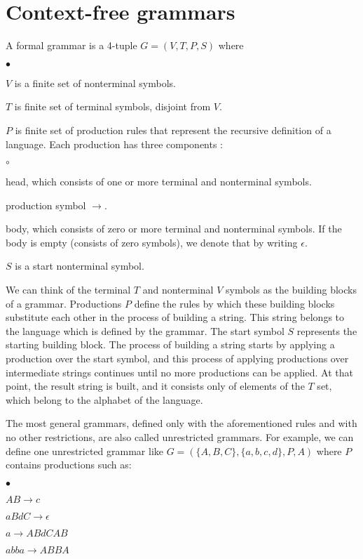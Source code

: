 \section{Context-free grammars}
A formal grammar is a 4-tuple $G = (V, T, P, S)$ \citep{sipser2013introduction} where
\begin{list}{$\bullet$}{}  	
	\item $V$ is a finite set of nonterminal symbols.
	\item $T$ is finite set of terminal symbols, disjoint from $V$.
	\item $P$ is finite set of production rules that represent the recursive definition of a language. Each production has three components \citep{hopcroft2007automatatheory}:
		\begin{list}{$\circ$}{}
			\item head, which consists of one or more terminal and nonterminal symbols.
			\item production symbol $\rightarrow$.
			\item body, which consists of zero or more terminal and nonterminal symbols. If the body is empty (consists of zero symbols), we denote that by writing $\epsilon$.
		\end{list}
	\item $S$ is a start nonterminal symbol.
\end{list}

We can think of the terminal $T$ and nonterminal $V$ symbols as the building blocks of a grammar. Productions $P$ define the rules by which these building blocks substitute each other in the process of building a string. This string belongs to the language which is defined by the grammar. The start symbol $S$ represents the starting building block. The process of building a string starts by applying a production over the start symbol, and this process of applying productions over intermediate strings continues until no more productions can be applied. At that point, the result string is built, and it consists only of elements of the $T$ set, which belong to the alphabet of the language.

The most general grammars, defined only with the aforementioned rules and with no other restrictions, are also called unrestricted grammars. For example, we can define one unrestricted grammar like $G = (\{A, B, C\}, \{a, b, c, d\}, P, A)$ where $P$ contains productions such as:
\begin{list}{$\bullet$}{}  	
	\item $AB \rightarrow c$
	\item $aBdC \rightarrow \epsilon$
	\item $a \rightarrow ABdCAB$
	\item $abba \rightarrow ABBA$
\end{list}

